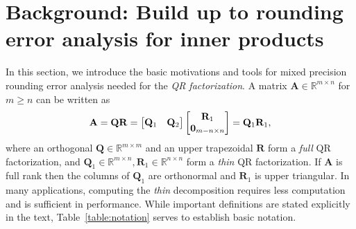 \documentclass[review,onefignum,onetabnum]{siamart190516}
\newcommand{\R}{\mathbb{R}}
\newcommand{\bb}[1]{\mathbf{#1}}
\begin{document}
\section{Background: Build up to rounding error analysis for inner products}\label{sec:background}
%
In this section, we introduce the basic motivations and tools for mixed precision rounding error analysis needed for the {\it QR factorization}.
A matrix $\bb{A} \in \R^{m \times n}$ for $m\geq n$ can be written as
\[\bb{A} = \bb{QR}=\begin{bmatrix}\bb{Q}_{1} & \bb{Q}_2\end{bmatrix} \begin{bmatrix}\bb{R}_{1} \\ \bb{0}_{m-n \times n}\end{bmatrix} = \bb{Q}_{1}\bb{R}_{1},\vspace{-0.3cm}%
\]
where an orthogonal $\bb{Q}\in\R^{m\times m}$ and an upper trapezoidal $\bb{R}$ form a \emph{full} QR factorization, and $\bb{Q}_{1}\in\R^{m\times n},\bb{R}_{1}\in\R^{n\times n}$ form a \emph{thin} QR factorization.
If $\bb{A}$ is full rank then the columns of $\bb{Q}_{1}$ are orthonormal
and $\bb{R}_1$ is upper triangular.
In many applications, computing the \emph{thin} decomposition requires less computation and is sufficient in performance. 
While important definitions are stated explicitly in the text, Table~\ref{table:notation} serves to establish basic notation.

\end{document}
